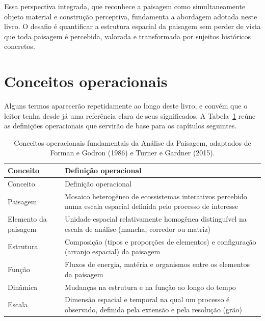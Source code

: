 \documentclass[
  portuguese,
  11pt,
  a4paper,
  open=any]{scrbook}
\begin{document}
Essa perspectiva integrada, que reconhece a paisagem como
simultaneamente objeto material e construção perceptiva, fundamenta a
abordagem adotada neste livro. O desafio é quantificar a estrutura
espacial da paisagem sem perder de vista que toda paisagem é percebida,
valorada e transformada por sujeitos históricos concretos.

\section{Conceitos operacionais}\label{conceitos-operacionais}

Alguns termos aparecerão repetidamente ao longo deste livro, e convém
que o leitor tenha desde já uma referência clara de seus significados. A
Tabela~\ref{tbl-conceitos-basicos} reúne as definições operacionais que
servirão de base para os capítulos seguintes.

\begin{longtable}[]{@{}
  >{\raggedright\arraybackslash}p{}
  >{\raggedright\arraybackslash}p{}@{}}
\caption{Conceitos operacionais fundamentais da Análise da Paisagem,
adaptados de Forman e Godron (1986) e Turner e Gardner
(2015).}\label{tbl-conceitos-basicos}\tabularnewline
\toprule\noalign{}
\begin{minipage}[b]{\linewidth}\raggedright
Conceito
\end{minipage} & \begin{minipage}[b]{\linewidth}\raggedright
Definição operacional
\end{minipage} \\
\midrule\noalign{}
\endfirsthead
\toprule\noalign{}
\begin{minipage}[b]{\linewidth}\raggedright
Conceito
\end{minipage} & \begin{minipage}[b]{\linewidth}\raggedright
Definição operacional
\end{minipage} \\
\midrule\noalign{}
\endhead
\bottomrule\noalign{}
\endlastfoot
Paisagem & Mosaico heterogêneo de ecossistemas interativos percebido
numa escala espacial definida pelo processo de interesse \\
Elemento da paisagem & Unidade espacial relativamente homogênea
distinguível na escala de análise (mancha, corredor ou matriz) \\
Estrutura & Composição (tipos e proporções de elementos) e configuração
(arranjo espacial) da paisagem \\
Função & Fluxos de energia, matéria e organismos entre os elementos da
paisagem \\
Dinâmica & Mudanças na estrutura e na função ao longo do tempo \\
Escala & Dimensão espacial e temporal na qual um processo é observado,
definida pela extensão e pela resolução (grão) \\
\end{longtable}
\end{document}
